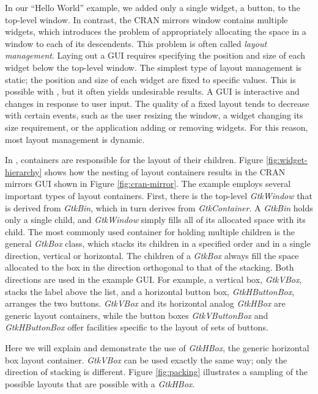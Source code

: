 \documentclass[article]{jss}
\begin{document}
In our ``Hello World'' example, we added only a single widget, a button, to the 
top-level window. In contrast, the CRAN mirrors window contains multiple 
widgets, which introduces the problem of appropriately allocating the space in a
window to each of its descendents. This problem is often called \emph{layout management}.
Laying out a GUI requires specifying the position and size of each widget below
the top-level window. The simplest type of layout management is static; the
position and size of each widget are fixed to specific values. This is possible
with , but it often yields undesirable results. A GUI is interactive 
and changes in response to user input. The quality of a fixed layout tends to decrease
with certain events, such as the user resizing
the window, a widget changing its size requirement, or the application
adding or removing widgets. For this reason, most layout management is dynamic.

In , containers are responsible for the layout
of their children. Figure \ref{fig:widget-hierarchy} shows how the nesting of 
layout containers results in the CRAN mirrors GUI shown in Figure 
\ref{fig:cran-mirror}. The example employs several important types of 
layout containers. First, there is the top-level \emph{GtkWindow} that
is derived from \emph{GtkBin}, which in turn derives from \emph{GtkContainer}.
A \emph{GtkBin} holds only a single child, and \emph{GtkWindow} simply fills all
of its allocated space with its child. The most commonly used container
for holding multiple children is the general \emph{GtkBox} class, which stacks its children
in a specified order and in a single direction, vertical or horizontal. The 
children of a \emph{GtkBox} always fill the space allocated to the box in 
the direction orthogonal to that of the stacking. Both
directions are used in the example GUI. For example, a vertical box, \emph{GtkVBox},
stacks the label above the list, and a horizontal button box, \emph{GtkHButtonBox},
arranges the two buttons. \emph{GtkVBox} and its horizontal analog \emph{GtkHBox}
are generic layout containers, while the button boxes \emph{GtkVButtonBox} and 
\emph{GtkHButtonBox} offer facilities specific to the layout of sets
of buttons.


Here we will explain and demonstrate the use of \emph{GtkHBox}, the generic
horizontal box layout container. \emph{GtkVBox} can be used exactly the same way;
only the direction of stacking is different. Figure \ref{fig:packing} illustrates
a sampling of the possible layouts that are possible with a \emph{GtkHBox}.
\end{document}

